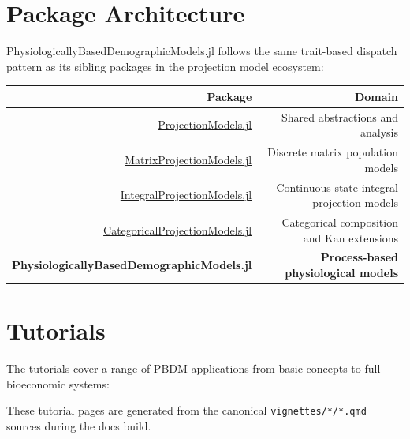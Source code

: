 \section{Package Architecture}



\label{8023844958205160459}{}


PhysiologicallyBasedDemographicModels.jl follows the same trait-based dispatch pattern as its sibling packages in the projection model ecosystem:




\begin{table}[h]
\centering
\begin{tabulary}{\linewidth}{R R}
\toprule
Package & Domain \\
\toprule
\href{https://ecorecipes.github.io/ProjectionModels.jl}{ProjectionModels.jl} & Shared abstractions and analysis \\
\href{https://ecorecipes.github.io/MatrixProjectionModels.jl}{MatrixProjectionModels.jl} & Discrete matrix population models \\
\href{https://ecorecipes.github.io/IntegralProjectionModels.jl}{IntegralProjectionModels.jl} & Continuous-state integral projection models \\
\href{https://ecorecipes.github.io/CategoricalProjectionModels.jl}{CategoricalProjectionModels.jl} & Categorical composition and Kan extensions \\
\textbf{PhysiologicallyBasedDemographicModels.jl} & \textbf{Process-based physiological models} \\
\bottomrule
\end{tabulary}

\end{table}



\section{Tutorials}



\label{2698662661577975771}{}


The tutorials cover a range of PBDM applications from basic concepts to full bioeconomic systems:



These tutorial pages are generated from the canonical \texttt{vignettes/*/*.qmd} sources during the docs build.




